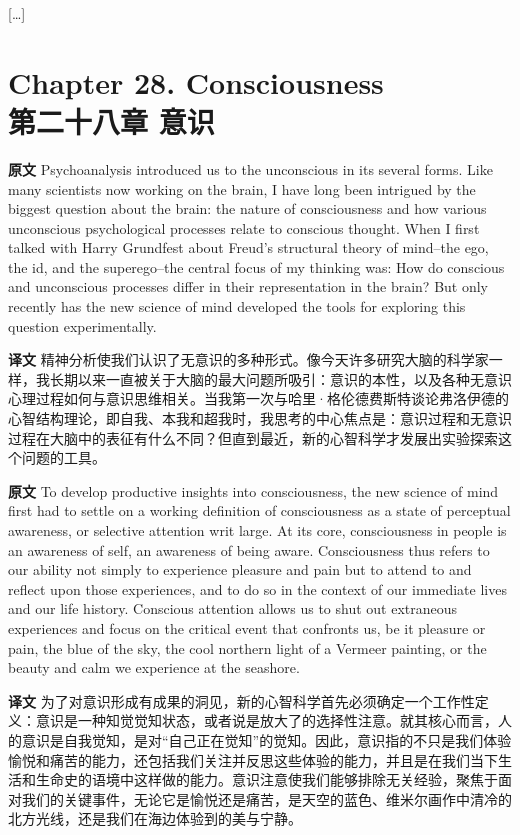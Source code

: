 \documentclass[UTF8,zihao=-4]{ctexart}
\newcommand{\BodyFont}{\fontsize{10.5pt}{15.5pt}\selectfont}
\newcommand{\origlabel}{\textbf{原文}\quad}
\newcommand{\translabel}{\textbf{译文}\quad}
\newenvironment{enblock}{\par\noindent\begingroup\BodyFont\origlabel}{\par\endgroup}
\newenvironment{zhblock}{\par\noindent\begingroup\BodyFont\translabel}{\par\endgroup\vspace{0.35em}}
\begin{document}
\begin{center}
[\dots]
\end{center}

\section*{Chapter 28. Consciousness\\第二十八章 意识}

\begin{enblock}
Psychoanalysis introduced us to the unconscious in its several forms. Like many scientists now working on the brain, I have long been intrigued by the biggest question about the brain: the nature of consciousness and how various unconscious psychological processes relate to conscious thought. When I first talked with Harry Grundfest about Freud's structural theory of mind--the ego, the id, and the superego--the central focus of my thinking was: How do conscious and unconscious processes differ in their representation in the brain? But only recently has the new science of mind developed the tools for exploring this question experimentally.
\end{enblock}
\begin{zhblock}
精神分析使我们认识了无意识的多种形式。像今天许多研究大脑的科学家一样，我长期以来一直被关于大脑的最大问题所吸引：意识的本性，以及各种无意识心理过程如何与意识思维相关。当我第一次与哈里·格伦德费斯特谈论弗洛伊德的心智结构理论，即自我、本我和超我时，我思考的中心焦点是：意识过程和无意识过程在大脑中的表征有什么不同？但直到最近，新的心智科学才发展出实验探索这个问题的工具。\end{zhblock}

\begin{enblock}
To develop productive insights into consciousness, the new science of mind first had to settle on a working definition of consciousness as a state of perceptual awareness, or selective attention writ large. At its core, consciousness in people is an awareness of self, an awareness of being aware. Consciousness thus refers to our ability not simply to experience pleasure and pain but to attend to and reflect upon those experiences, and to do so in the context of our immediate lives and our life history. Conscious attention allows us to shut out extraneous experiences and focus on the critical event that confronts us, be it pleasure or pain, the blue of the sky, the cool northern light of a Vermeer painting, or the beauty and calm we experience at the seashore.
\end{enblock}
\begin{zhblock}
为了对意识形成有成果的洞见，新的心智科学首先必须确定一个工作性定义：意识是一种知觉觉知状态，或者说是放大了的选择性注意。就其核心而言，人的意识是自我觉知，是对“自己正在觉知”的觉知。因此，意识指的不只是我们体验愉悦和痛苦的能力，还包括我们关注并反思这些体验的能力，并且是在我们当下生活和生命史的语境中这样做的能力。意识注意使我们能够排除无关经验，聚焦于面对我们的关键事件，无论它是愉悦还是痛苦，是天空的蓝色、维米尔画作中清冷的北方光线，还是我们在海边体验到的美与宁静。\end{zhblock}
\end{document}
